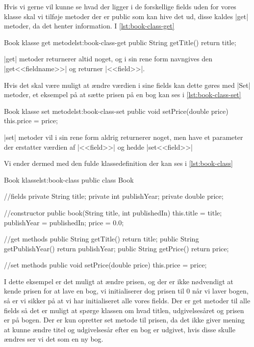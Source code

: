 Hvis vi gerne vil kunne se hvad der ligger i de forskellige fields uden for vores klasse skal vi tilføje metoder der er public som kan hive det ud, disse kaldes \JavaInline|get| metoder, da det henter information. I \autoref{lst:book-class-get}

\begin{JavaCode}{Book klasse get metode}{lst:book-class-get}
	public String getTitle() {
		return title;
	}
\end{JavaCode}

\JavaInline|get| metoder returnerer altid noget, og i sin rene form navngives den \JavaInline|get<<fieldname>>| og returner \JavaInline|<<field>>|.

Hvis det skal være muligt at ændre værdien i sine fields kan dette gøres med \JavaInline|Set| metoder, et eksempel på at sætte prisen på en bog kan ses i \autoref{lst:book-class-set}

\begin{JavaCode}{Book klasse set metode}{lst:book-class-set}
	public void setPrice(double price) {
		this.price = price;
	}
\end{JavaCode}

\JavaInline|set| metoder vil i sin rene form aldrig returnerer noget, men have et parameter der erstatter værdien af \JavaInline|<<field>>| og hedde \JavaInline|set<<field>>|

Vi ender dermed med den fulde klassedefinition der kan ses i \autoref{lst:book-class}

\begin{JavaCode}{Book klasse}{lst:book-class}
	public class Book {
		//fields
		private String title;
		private int publishYear;
		private double price;
		
		//constructor
		public book(String title, int publishedIn) {
			this.title = title;
			publishYear = publishedIn;
			price = 0.0;
		}
	
		//get methods
		public String getTitle() {
			return title;
		}
		public String getPublishYear() {
			return publishYear;
		}
		public String getPrice() {
			return price;
		}
		
		//set methods
		public void setPrice(double price) {
			this.price = price;
		}
	}
\end{JavaCode}

I dette eksempel er det muligt at ændre prisen, og der er ikke nødvendigt at kende prisen for at lave en bog, vi initialiserer dog prisen til 0 når vi laver bogen, så er vi sikker på at vi har initialiseret alle vores fields. Der er get metoder til alle fields så det er muligt at spørge klassen om hvad titlen, udgivelsesåret og prisen er på bogen. Der er kun opretter set metode til prisen, da det ikke giver mening at kunne ændre titel og udgivelsesår efter en bog er udgivet, hvis disse skulle ændres ser vi det som en ny bog.


